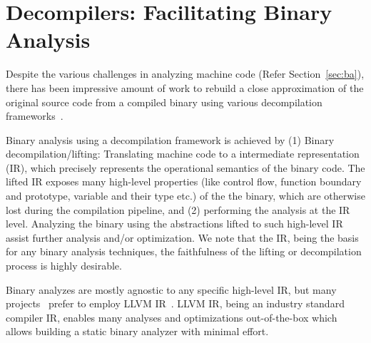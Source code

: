 \section{Decompilers: Facilitating Binary Analysis}\label{sec:decompilers}

Despite the various challenges in analyzing machine code (Refer Section~\ref{sec:ba}), there has been
impressive amount of work to rebuild a close approximation of the original source code from a
compiled binary using various decompilation frameworks~\cite{McSema:Recon14,Remill,Angr1,BAP:CAV11,Radare2,FCD,BitBlaze:2008,hexray,Fokin:2011,eschulte2018bed,katz2018rnn,Schwartz:2013,IDA,mctoll,revgen}.

Binary analysis using a decompilation framework is achieved by (1) Binary decompilation/lifting: Translating
machine code to a intermediate representation (IR), which precisely represents
the operational semantics of the binary code. The lifted IR exposes many
high-level properties (like control flow, function boundary and prototype,
    variable and their type etc.) of the the binary, which are otherwise lost
during the compilation pipeline, and (2) performing the analysis at the IR
level.  Analyzing the binary using the abstractions lifted to such high-level
IR assist further analysis and/or optimization. We note that the IR, being the basis for any binary analysis techniques, the faithfulness of the lifting or decompilation process is highly desirable. 

Binary analyzes are mostly agnostic to any specific high-level IR, but many
projects~\cite{McSema:Recon14,Remill,FCD,reopt,mctoll} prefer to employ LLVM
IR~\cite{Lattner:2004}. LLVM IR, being an industry standard compiler IR, enables many analyses and
optimizations out-of-the-box which allows building a static binary analyzer
with minimal effort.
